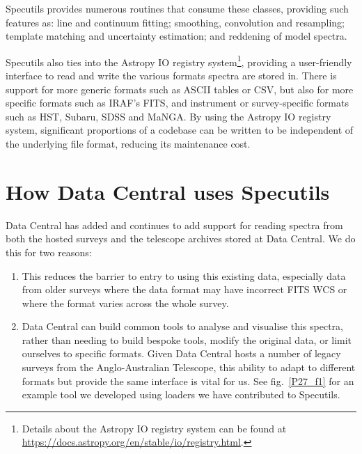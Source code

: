 \documentclass[11pt,twoside]{article}
\begin{document}
Specutils provides numerous routines that consume these classes, providing such
features as: line and continuum fitting; smoothing, convolution and resampling;
template matching and uncertainty estimation; and reddening of model spectra.

Specutils also ties into the Astropy IO registry system\footnote{
  Details about the Astropy IO registry system can be found at
  \url{https://docs.astropy.org/en/stable/io/registry.html}.
}, providing a user-friendly interface to read and write the various formats
spectra are stored in. There is support for more generic formats such as ASCII
tables or CSV, but also for more specific formats such as IRAF's FITS, and
instrument or survey-specific formats such as HST, Subaru, SDSS and MaNGA. By
using the Astropy IO registry system, significant proportions of a codebase can
be written to be independent of the underlying file format, reducing its
maintenance cost.

\section{How Data Central uses Specutils}
Data Central \citep{2020SPIE11203E..1DO,2019lgei.confE..11M} has added and continues to add support for reading spectra from
both the hosted surveys and the telescope archives stored at Data Central. We do
this for two reasons:
\begin{enumerate}
  \item This reduces the barrier to entry to using this existing
    data, especially data from older surveys where the data format may have
    incorrect FITS WCS or where the format varies across the whole survey.
  \item Data Central can build common tools to analyse and visualise this
    spectra, rather than needing to build bespoke tools, modify the original
    data, or limit ourselves to specific formats. Given Data Central hosts a
    number of legacy surveys from the Anglo-Australian Telescope, this ability
    to adapt to different formats but provide the same interface is vital for
    us. See fig.~\ref{P27_f1} for an example tool we developed using loaders we
    have contributed to Specutils.
\end{enumerate}

\end{document}
